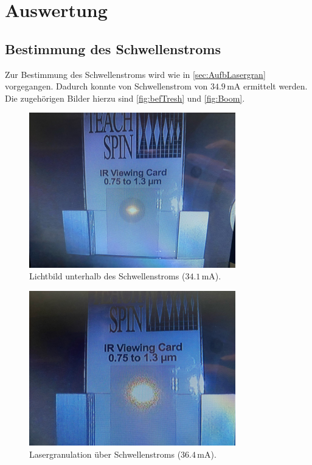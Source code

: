 \section{Auswertung}
\label{sec:Auswertung}

%
\subsection{Bestimmung des Schwellenstroms}
\label{sec:Ausw1}
Zur Bestimmung des Schwellenstroms wird wie in \autoref{sec:AufbLasergran} vorgegangen. Dadurch konnte von Schwellenstrom von $34.9\,\unit{\milli \ampere}$ ermittelt werden. Die zugehörigen Bilder hierzu sind \autoref{fig:befTresh} und \autoref{fig:Boom}.

\begin{figure}
    \centering
        \includegraphics[width=0.8\textwidth]{beforeThreshold.jpeg}
        \caption{Lichtbild unterhalb des Schwellenstroms ($34.1\,\unit{\milli \ampere}$).}
        \label{fig:befTresh} 
\end{figure}
\begin{figure}
    \centering
        \includegraphics[width=0.8\textwidth]{Lasergranulation.jpeg}
        \caption{Lasergranulation über Schwellenstroms ($36.4\,\unit{\milli \ampere}$).}
        \label{fig:Boom} 
\end{figure}

